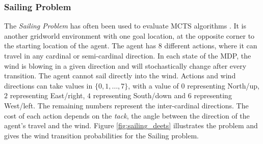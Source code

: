 \subsubsection{Sailing Problem}
\label{sec:4-4-1-3-sailing}

    The \textit{Sailing Problem} has often been used to evaluate MCTS algorithms \cite{peret2004line,uct,tolpin2012mcts,brue}. It is another gridworld environment with one goal location, at the opposite corner to the starting location of the agent. The agent has 8 different actions, where it can travel in any cardinal or semi-cardinal direction. In each state of the MDP, the wind is blowing in a given direction and will stochastically change after every transition. The agent cannot sail directly into the wind. Actions and wind directions can take values in $\{0,1,\ldots,7\}$, with a value of $0$ representing North/up, $2$ representing East/right, $4$ representing South/down and $6$ representing West/left. The remaining numbers represent the inter-cardinal directions. The cost of each action depends on the \textit{tack}, the angle between the direction of the agent's travel and the wind. Figure \ref{fig:sailing_deets} illustrates the problem and gives the wind transition probabilities for the Sailing problem. 

